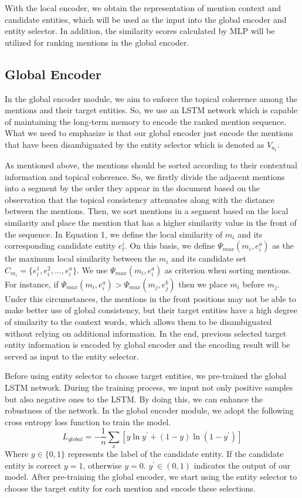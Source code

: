 \documentclass[sigconf]{acmart}
\begin{document}
With the local encoder, we obtain the representation of mention context and candidate entities, which will be used as the input into the global encoder and entity selector. In addition, the similarity scores calculated by MLP will be utilized for ranking mentions in the global encoder.

\subsection{Global Encoder}
In the global encoder module, we aim to enforce the topical coherence among the mentions and their target entities. So, we use an LSTM network which is capable of maintaining the long-term memory to encode the ranked mention sequence. What we need to emphasize is that our global encoder just encode the mentions that have been disambiguated by the entity selector which is denoted as $V_{a_t}$.

As mentioned above, the mentions should be sorted according to their contextual information and topical coherence.  So, we firstly divide the adjacent mentions into a segment by the order they appear in the document based on the observation that the topical consistency attenuates along with the distance between the mentions. Then, we sort mentions in a segment based on the local similarity and place the mention that has a higher similarity value in the front of the sequence. In Equation 1, we define the local similarity of $m_i$ and its corresponding candidate entity $e_t^i$. On this basis, we define $\Psi_{max}(m_i, e_i^a)$ as the the maximum local similarity between the $m_i$ and its candidate set $C_{m_i} = \{e_i^1, e_i^2,..., e_i^n\}$. We use $\Psi_{max}(m_i, e_i^a)$ as criterion when sorting mentions. For instance, if $\Psi_{max}(m_i, e_i^a) > \Psi_{max}(m_j, e_j^b)$ then we place $m_i$ before $m_j$. Under this circumstances, the mentions in the front positions may not be able to make better use of global consistency, but their target entities have a high degree of similarity to the context words, which allows them to be disambiguated without relying on additional information. In the end, previous selected target entity information is encoded by global encoder and the encoding result will be served as input to the entity selector.

Before using entity selector to choose target entities, we pre-trained the global LSTM network. During the training process, we input not only positive samples but also negative ones to the LSTM. By doing this, we can enhance the robustness of the network. In the global encoder module, we adopt the following cross entropy loss function to train the model.
\begin{equation}       
L_{global} = -\frac{1}{n}\sum_x{\left[y\ln{y^{'}} + (1-y)\ln(1-y^{'})\right]}
\end{equation}
Where $y\in\{0,1\}$ represents the label of the candidate entity. If the candidate entity is correct $y=1$, otherwise $y=0$. $y^{'}\in(0,1)$ indicates the output of our model. After pre-training the global encoder, we start using the entity selector to choose the target entity for each mention and encode these selections.
\end{document}
